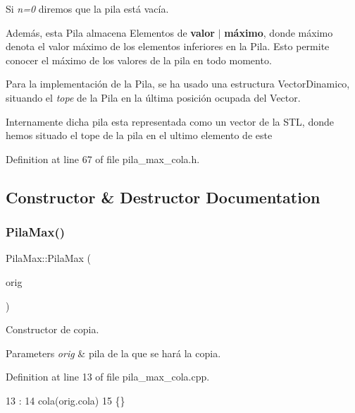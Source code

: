 Si {\itshape n=0} diremos que la pila está vacía.

Además, esta Pila almacena Elementos de {\bfseries valor} {\bfseries }$\vert$ {\bfseries máximo}, donde máximo denota el valor máximo de los elementos inferiores en la Pila. Esto permite conocer el máximo de los valores de la pila en todo momento.

Para la implementación de la Pila, se ha usado una estructura Vector\+Dinamico, situando el {\itshape tope} de la Pila en la última posición ocupada del Vector.

Internamente dicha pila esta representada como un vector de la S\+TL, donde hemos situado el tope de la pila en el ultimo elemento de este 

Definition at line 67 of file pila\+\_\+max\+\_\+cola.\+h.



\subsection{Constructor \& Destructor Documentation}
\mbox{\label{classPilaMax_af092e43441ce9df4066c5157f73b8e7a}} 
\subsubsection{\texorpdfstring{Pila\+Max()}{PilaMax()}\hspace{0.1cm}{\footnotesize\ttfamily [1/2]}}
{\footnotesize\ttfamily Pila\+Max\+::\+Pila\+Max (\begin{DoxyParamCaption}\item[{const \hyperlink{classPilaMax}{Pila\+Max} \&}]{orig }\end{DoxyParamCaption})}



Constructor de copia. 


\begin{DoxyParams}{Parameters}
{\em orig} & pila de la que se hará la copia. \\
\hline
\end{DoxyParams}


Definition at line 13 of file pila\+\_\+max\+\_\+cola.\+cpp.


\begin{DoxyCode}
13                                    :
14 cola(orig.cola)
15 \{\}
\end{DoxyCode}
\mbox{\label{classPilaMax_af092e43441ce9df4066c5157f73b8e7a}} 
